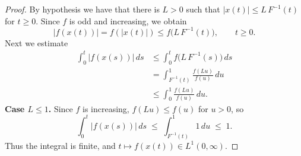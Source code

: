 \documentclass[a4paper,10pt,reqno]{amsart}
\numberwithin{equation}{section}
\theoremstyle{definition}
\theoremstyle{remark}
\DeclareMathOperator{\1}{\mathbbm 1}
\begin{document}
	\begin{proof}
		By hypothesis we have that there is $L>0$ such that 
		$|x(t)| \le L\,F^{-1}(t)$ for $t\geq 0$. Since $f$ is odd and increasing, we obtain
		\[
		|f(x(t))| = f(|x(t)|) \le f\!\big(L\,F^{-1}(t)\big),
		\qquad t\geq 0.
		\]
		Next we estimate 
		\begin{align*}
			\int_{0}^{t} |f(x(s))|\,ds
			&\le \int_{0}^{t} f\!\big(L\,F^{-1}(s)\big)\,ds \\[6pt]
			&= \int_{F^{-1}(t)}^{1} \frac{f(Lu)}{f(u)}\,du \\[6pt]
			&\leq  \int_{0}^{1} \frac{f(Lu)}{f(u)}\,du .
		\end{align*}
		\noindent\textbf{Case $L\le 1$.}  
		Since $f$ is increasing, $f(Lu)\le f(u)$ for $u>0$, so
		\[
		\int_{0}^{t} |f(x(s))|\,ds
		\;\le\; \int_{F^{-1}(t)}^{1} 1\,du
		\;\le\; 1 .
		\]
		Thus the integral is finite, and $t\mapsto f(x(t)) \in L^1(0,\infty)$.
		

\end{proof}
\end{document}
